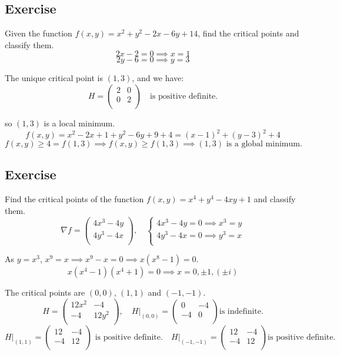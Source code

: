 \documentclass[11pt]{article}
\begin{document}
\subsection*{Exercise}
Given the function $f(x,y) = x^2 + y^2 - 2x - 6y + 14$, find the critical points and classify them.
\[
2x - 2 = 0 \implies x = 1
\]
\[
2y - 6 = 0 \implies y = 3
\]

The unique critical point is $(1,3)$, and we have:
\[
H = \begin{pmatrix}
    2 & 0 \\
    0 & 2 \\
\end{pmatrix} \quad \text{is positive definite.}
\]

so $(1,3)$ is a local minimum.
\[
f(x,y) = x^2 -2x +1 + y^2 - 6y + 9 + 4 = (x - 1)^2 + (y - 3)^2 + 4
\]
\[
f(x,y) \geq 4 = f(1,3) \implies f(x,y) \geq f(1,3) \implies (1,3) \text{ is a global minimum.}
\]

\subsection*{Exercise}
Find the critical points of the function $f(x,y) = x^4 + y^4 - 4xy + 1$ and classify them.
\[
\nabla f = \begin{pmatrix}
    4x^3 - 4y \\
    4y^3 - 4x \\
\end{pmatrix}, \quad \begin{cases}
    4x^3 - 4y = 0 \implies x^3 = y \\   
    4y^3 - 4x = 0 \implies y^3 = x \\
\end{cases}
\]

As $y = x^3$, $x^9 = x \implies x^9 - x = 0 \implies x(x^8 - 1) = 0$.
\[
x(x^4 - 1)(x^4 + 1) = 0 \implies x = 0, \pm 1, (\pm i)
\]

The critical points are $(0,0)$, $(1,1)$ and $(-1,-1)$.
\[
H = \begin{pmatrix}
    12x^2 & -4 \\
    -4 & 12y^2 \\
\end{pmatrix}, \quad H\big|_{(0,0)} = \begin{pmatrix}
    0 & -4 \\
    -4 & 0 \\
\end{pmatrix} \text{is indefinite.}
\]
\[
H\big|_{(1,1)} = \begin{pmatrix}
    12 & -4 \\
    -4 & 12 \\
\end{pmatrix} \text{ is positive definite.} \quad  H\big|_{(-1,-1)} = \begin{pmatrix}
    12 & -4 \\
    -4 & 12 \\
\end{pmatrix} \text{is positive definite.}
\]
\end{document}
